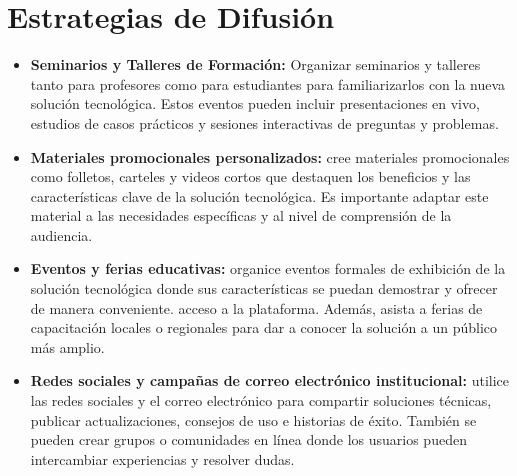 \documentclass{article}
\begin{document}
\section{Estrategias de Difusión}
\begin{itemize}
  \item \textbf{Seminarios y Talleres de Formación:} Organizar seminarios y talleres tanto para profesores como para estudiantes para familiarizarlos con la nueva solución tecnológica. Estos eventos pueden incluir presentaciones en vivo, estudios de casos prácticos y sesiones interactivas de preguntas y problemas.
  \item \textbf{Materiales promocionales personalizados:} cree materiales promocionales como folletos, carteles y videos cortos que destaquen los beneficios y las características clave de la solución tecnológica. Es importante adaptar este material a las necesidades específicas y al nivel de comprensión de la audiencia. 
  \item \textbf{Eventos y ferias educativas:} organice eventos formales de exhibición de la solución tecnológica donde sus características se puedan demostrar y ofrecer de manera conveniente. acceso a la plataforma. Además, asista a ferias de capacitación locales o regionales para dar a conocer la solución a un público más amplio.
  \item \textbf{Redes sociales y campañas de correo electrónico institucional:} utilice las redes sociales y el correo electrónico para compartir soluciones técnicas, publicar actualizaciones, consejos de uso e historias de éxito. También se pueden crear grupos o comunidades en línea donde los usuarios pueden intercambiar experiencias y resolver dudas.
\end{itemize}
\end{document}

